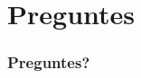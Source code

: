 \documentclass{beamer}
\begin{document}
\section*{Preguntes}
\begin{frame}
    \frametitle{Preguntes?}

% 
% 
% 
% 

\end{frame}
\end{document}
